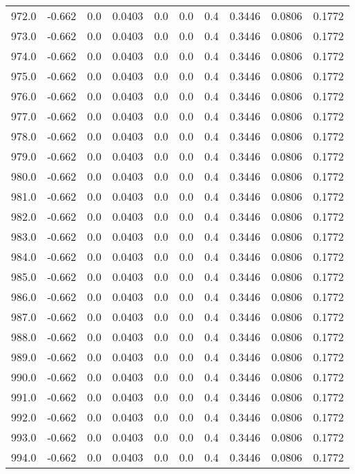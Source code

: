 \begin{longtable}{lrrrrrrrrr}
972.0 & -0.662 & 0.0 & 0.0403 & 0.0 & 0.0 & 0.4 & 0.3446 & 0.0806 & 0.1772 \\
973.0 & -0.662 & 0.0 & 0.0403 & 0.0 & 0.0 & 0.4 & 0.3446 & 0.0806 & 0.1772 \\
974.0 & -0.662 & 0.0 & 0.0403 & 0.0 & 0.0 & 0.4 & 0.3446 & 0.0806 & 0.1772 \\
975.0 & -0.662 & 0.0 & 0.0403 & 0.0 & 0.0 & 0.4 & 0.3446 & 0.0806 & 0.1772 \\
976.0 & -0.662 & 0.0 & 0.0403 & 0.0 & 0.0 & 0.4 & 0.3446 & 0.0806 & 0.1772 \\
977.0 & -0.662 & 0.0 & 0.0403 & 0.0 & 0.0 & 0.4 & 0.3446 & 0.0806 & 0.1772 \\
978.0 & -0.662 & 0.0 & 0.0403 & 0.0 & 0.0 & 0.4 & 0.3446 & 0.0806 & 0.1772 \\
979.0 & -0.662 & 0.0 & 0.0403 & 0.0 & 0.0 & 0.4 & 0.3446 & 0.0806 & 0.1772 \\
980.0 & -0.662 & 0.0 & 0.0403 & 0.0 & 0.0 & 0.4 & 0.3446 & 0.0806 & 0.1772 \\
981.0 & -0.662 & 0.0 & 0.0403 & 0.0 & 0.0 & 0.4 & 0.3446 & 0.0806 & 0.1772 \\
982.0 & -0.662 & 0.0 & 0.0403 & 0.0 & 0.0 & 0.4 & 0.3446 & 0.0806 & 0.1772 \\
983.0 & -0.662 & 0.0 & 0.0403 & 0.0 & 0.0 & 0.4 & 0.3446 & 0.0806 & 0.1772 \\
984.0 & -0.662 & 0.0 & 0.0403 & 0.0 & 0.0 & 0.4 & 0.3446 & 0.0806 & 0.1772 \\
985.0 & -0.662 & 0.0 & 0.0403 & 0.0 & 0.0 & 0.4 & 0.3446 & 0.0806 & 0.1772 \\
986.0 & -0.662 & 0.0 & 0.0403 & 0.0 & 0.0 & 0.4 & 0.3446 & 0.0806 & 0.1772 \\
987.0 & -0.662 & 0.0 & 0.0403 & 0.0 & 0.0 & 0.4 & 0.3446 & 0.0806 & 0.1772 \\
988.0 & -0.662 & 0.0 & 0.0403 & 0.0 & 0.0 & 0.4 & 0.3446 & 0.0806 & 0.1772 \\
989.0 & -0.662 & 0.0 & 0.0403 & 0.0 & 0.0 & 0.4 & 0.3446 & 0.0806 & 0.1772 \\
990.0 & -0.662 & 0.0 & 0.0403 & 0.0 & 0.0 & 0.4 & 0.3446 & 0.0806 & 0.1772 \\
991.0 & -0.662 & 0.0 & 0.0403 & 0.0 & 0.0 & 0.4 & 0.3446 & 0.0806 & 0.1772 \\
992.0 & -0.662 & 0.0 & 0.0403 & 0.0 & 0.0 & 0.4 & 0.3446 & 0.0806 & 0.1772 \\
993.0 & -0.662 & 0.0 & 0.0403 & 0.0 & 0.0 & 0.4 & 0.3446 & 0.0806 & 0.1772 \\
994.0 & -0.662 & 0.0 & 0.0403 & 0.0 & 0.0 & 0.4 & 0.3446 & 0.0806 & 0.1772 \\

\end{longtable}
